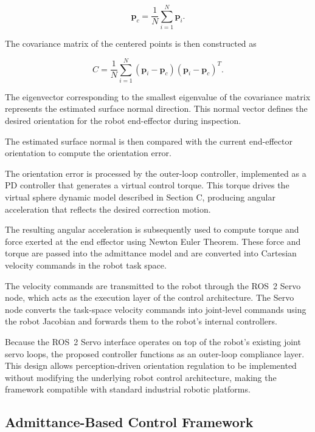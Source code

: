 \documentclass[journal]{IEEEtran}
\begin{document}
\begin{equation}
\mathbf{p}_c = \frac{1}{N} \sum_{i=1}^{N} \mathbf{p}_i.
\end{equation}

The covariance matrix of the centered points is then constructed as

\begin{equation}
C = \frac{1}{N} \sum_{i=1}^{N} (\mathbf{p}_i - \mathbf{p}_c)(\mathbf{p}_i - \mathbf{p}_c)^T.
\end{equation}

The eigenvector corresponding to the smallest eigenvalue of the covariance matrix represents the estimated surface normal direction. This normal vector defines the desired orientation for the robot end-effector during inspection.

The estimated surface normal is then compared with the current end-effector orientation to compute the orientation error. 

The orientation error is processed by the outer-loop controller, implemented as a PD controller that generates a virtual control torque. This torque drives the virtual sphere dynamic model described in Section C, producing angular acceleration that reflects the desired correction motion.

The resulting angular acceleration is subsequently used to compute torque and force exerted at the end effector using Newton Euler Theorem. These force and torque are passed into the admittance model and are converted into Cartesian velocity commands in the robot task space.

The velocity commands are transmitted to the robot through the ROS~2 Servo node, which acts as the execution layer of the control architecture. The Servo node converts the task-space velocity commands into joint-level commands using the robot Jacobian and forwards them to the robot's internal controllers.

Because the ROS~2 Servo interface operates on top of the robot's existing joint servo loops, the proposed controller functions as an outer-loop compliance layer. This design allows perception-driven orientation regulation to be implemented without modifying the underlying robot control architecture, making the framework compatible with standard industrial robotic platforms.
\subsection{Admittance-Based Control Framework}
\end{document}
